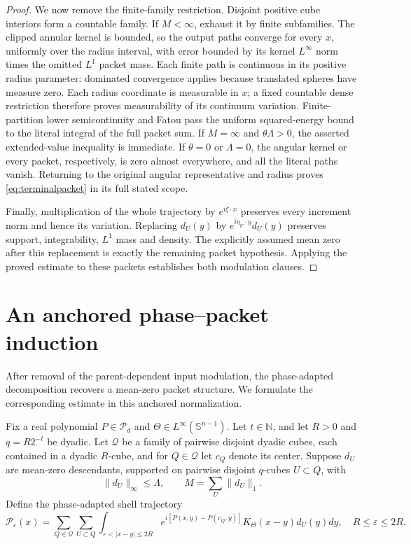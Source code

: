 \documentclass[11pt]{article}
\numberwithin{equation}{section}
\theoremstyle{remark}
\theoremstyle{definition}
\newcommand{\Sph}{\mathbb S}
\newcommand{\norm}[1]{\lVert #1\rVert}
\begin{document}
\begin{proof}
We now remove the finite-family restriction.  Disjoint positive cube
interiors form a countable family.  If $M<\infty$, exhaust it by finite
subfamilies.  The clipped annular kernel is bounded, so the output
paths converge for every $x$, uniformly over the radius interval, with
error bounded by its kernel $L^\infty$ norm times the omitted $L^1$
packet mass.  Each finite path is continuous in its positive radius
parameter: dominated convergence applies because translated spheres
have measure zero.  Each radius coordinate is measurable in $x$;
a fixed countable dense restriction therefore proves measurability of
its continuum variation.  Finite-partition lower semicontinuity and
Fatou pass the uniform squared-energy bound to the literal integral of
the full packet sum.  If $M=\infty$ and $\theta\Lambda>0$, the asserted
extended-value inequality is immediate.  If $\theta=0$ or $\Lambda=0$,
the angular kernel or every packet, respectively, is zero almost
everywhere, and all the literal paths vanish.  Returning to the original
angular representative and radius proves \eqref{eq:terminalpacket} in
its full stated scope.

Finally, multiplication of the whole trajectory by $e^{i\xi\cdot x}$
preserves every increment norm and hence its variation.  Replacing
$d_U(y)$ by $e^{i\eta_U\cdot y}d_U(y)$ preserves support, integrability,
$L^1$ mass and density.  The explicitly assumed mean zero after this
replacement is exactly the remaining packet hypothesis.  Applying the
proved estimate to these packets establishes both modulation clauses.
\end{proof}

\section{An anchored phase--packet induction}
\label{sec:anchored-induction}

After removal of the parent-dependent input modulation, the
phase-adapted decomposition recovers a mean-zero packet structure.  We
formulate the corresponding estimate in this anchored normalization.

Fix a real polynomial $P\in\mathcal P_d$ and
$\Theta\in L^\infty(\Sph^{n-1})$.  Let $t\in\mathbb N$, and let $R>0$
and $q=R2^{-t}$ be dyadic.  Let
$\mathcal Q$ be a family of
pairwise disjoint dyadic cubes, each contained in a dyadic $R$-cube, and
for $Q\in\mathcal Q$ let $c_Q$ denote its center.
Suppose $d_U$ are mean-zero descendants, supported on pairwise disjoint
$q$-cubes $U\subset Q$, with
\begin{equation}\label{eq:packetdensity}
 \norm{d_U}_\infty\le\Lambda,
 \qquad M=\sum_U\norm{d_U}_1.
\end{equation}
Define the phase-adapted shell trajectory
\begin{equation}\label{eq:anchoredtraj}
 \mathcal P_\varepsilon(x)=
 \sum_{Q\in\mathcal Q}\sum_{U\subset Q}
 \int_{\varepsilon<|x-y|\le2R}
 e^{i[P(x,y)-P(c_Q,y)]}K_\Theta(x-y)d_U(y)dy,
 \quad R\le\varepsilon\le2R.
\end{equation}
\end{document}
